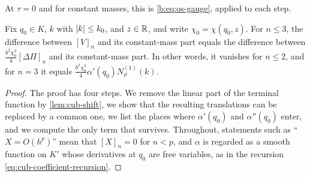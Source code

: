 At $\tau=0$ and for constant masses, this is \eqref{b:eq:os-gauge}, applied
to each step.

\begin{lemma}\label{lem:cub-mass}
Fix $q_0\in K$, $k$ with $\lvert k\rvert\le k_0$, and $z\in\mathbb R$, and write
$\chi_0=\chi(q_0,z)$. For $n\le3$, the difference between $[V]_n$ and its
constant-mass part equals the difference between
$\frac{b^2\chi_0^2}4[\Delta\Pi]_n$ and its constant-mass part. In other words,
it vanishes for $n\le2$, and for $n=3$ it equals
$\frac{b^2\chi_0^2}4\alpha'(q_0)N^{(1)}_\vartheta(k)$.
\end{lemma}

\begin{proof}
The proof has four steps. We remove the linear part of the terminal function
by \cref{lem:cub-shift}, we show that the resulting translations can be
replaced by a common one, we list the places where $\alpha'(q_0)$ and
$\alpha''(q_0)$ enter, and we compute the only term that survives. Throughout,
statements such as ``$X=O(h^p)$'' mean that $[X]_n=0$ for $n<p$, and $\alpha$
is regarded as a smooth function on $K'$ whose derivatives at $q_0$ are free
variables, as in the recursion \eqref{eq:cub-coefficient-recursion}.


\end{proof}
